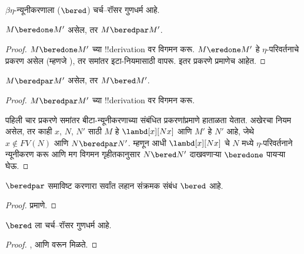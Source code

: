 \documentclass[../../../include/open-logic-section]{subfiles}
\begin{document}


$\beta\eta$-न्यूनीकरणाला ($\bered$) चर्च–रॉसर
गुणधर्म आहे.

\begin{lem}
  $M \beredone M'$ असेल, तर $M \beredpar M'$.
\end{lem}

\begin{proof}
  $M \beredone M'$ च्या !!{derivation} वर विगमन करू.
  $M \eredone M'$ हे $\eta$-परिवर्तनाचे प्रकरण
  असेल (म्हणजे ),
  तर समांतर इटा-नियमासाठी 
  वापरू. इतर प्रकरणे 
  प्रमाणेच आहेत.
\end{proof}

\begin{lem}
  $M \beredpar M'$ असेल, तर $M \bered M'$.
\end{lem}

\begin{proof} $M \beredpar M'$ च्या !!{derivation} वर विगमन करू.

  पहिली चार प्रकरणे समांतर बीटा-न्यूनीकरणाच्या
  संबंधित प्रकरणांप्रमाणे हाताळता येतात. अखेरचा नियम
   असेल, तर काही $x$, $N$,
  $N'$ साठी $M$ हे $\lambd[x][Nx]$ आणि $M'$ हे $N'$
  आहे, जेथे $x \notin FV(N)$ आणि $N \beredpar N'$.
  म्हणून आधी $\lambd[x][Nx]$ चे $N$ मध्ये
  $\eta$-परिवर्तनाने न्यूनीकरण करू आणि मग विगमन
  गृहीतकानुसार $N \bered N'$ दाखवणाऱ्या $\beredone$
  पायऱ्या घेऊ.
\end{proof}

\begin{lem}
  $\beredpar$ समाविष्ट करणारा सर्वांत लहान संक्रमक
  संबंध $\bered$ आहे.
\end{lem}

\begin{proof}
   प्रमाणे.
\end{proof}

\begin{thm}
  $\bered$ ला चर्च–रॉसर गुणधर्म आहे.
\end{thm}

\begin{proof}
  ,  आणि
   वरून मिळते.
\end{proof}
\end{document}
